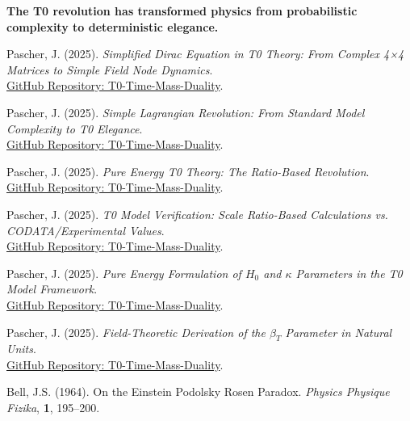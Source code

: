\documentclass[12pt,a4paper]{article}
\begin{document}
	\textbf{The T0 revolution has transformed physics from probabilistic \\
		complexity to deterministic elegance.}
	
	\begin{thebibliography}{99}
		Pascher, J. (2025). \textit{Simplified Dirac Equation in T0 Theory: From Complex 4×4 Matrices to Simple Field Node Dynamics}. \\
		\href{https://github.com/jpascher/T0-Time-Mass-Duality/blob/main/2/pdf/diracVereinfachtEn.pdf}{GitHub Repository: T0-Time-Mass-Duality}.
		
		Pascher, J. (2025). \textit{Simple Lagrangian Revolution: From Standard Model Complexity to T0 Elegance}. \\
		\href{https://github.com/jpascher/T0-Time-Mass-Duality/blob/main/2/pdf/LagrandianVergleichEn.pdf}{GitHub Repository: T0-Time-Mass-Duality}.
		
		Pascher, J. (2025). \textit{Pure Energy T0 Theory: The Ratio-Based Revolution}. \\
		\href{https://github.com/jpascher/T0-Time-Mass-Duality/blob/main/2/pdf/Elimination_Of_Mass_Dirac_LagEn.pdf}{GitHub Repository: T0-Time-Mass-Duality}.
		
		Pascher, J. (2025). \textit{T0 Model Verification: Scale Ratio-Based Calculations vs. CODATA/Experimental Values}. \\
		\href{https://github.com/jpascher/T0-Time-Mass-Duality/blob/main/2/pdf/Elimination_Of_Mass_Dirac_TabelleEn.pdf}{GitHub Repository: T0-Time-Mass-Duality}.
		
		Pascher, J. (2025). \textit{Pure Energy Formulation of $H_0$ and $\kappa$ Parameters in the T0 Model Framework}. \\
		\href{https://github.com/jpascher/T0-Time-Mass-Duality/blob/main/2/pdf/Ho_EnergieEn.pdf}{GitHub Repository: T0-Time-Mass-Duality}.
		
		Pascher, J. (2025). \textit{Field-Theoretic Derivation of the $\beta_T$ Parameter in Natural Units}. \\
		\href{https://github.com/jpascher/T0-Time-Mass-Duality/blob/main/2/pdf/DerivationVonBetaEn.pdf}{GitHub Repository: T0-Time-Mass-Duality}.
		
		Bell, J.S. (1964). On the Einstein Podolsky Rosen Paradox. \textit{Physics Physique Fizika}, \textbf{1}, 195--200.
		

\end{thebibliography}
\end{document}
